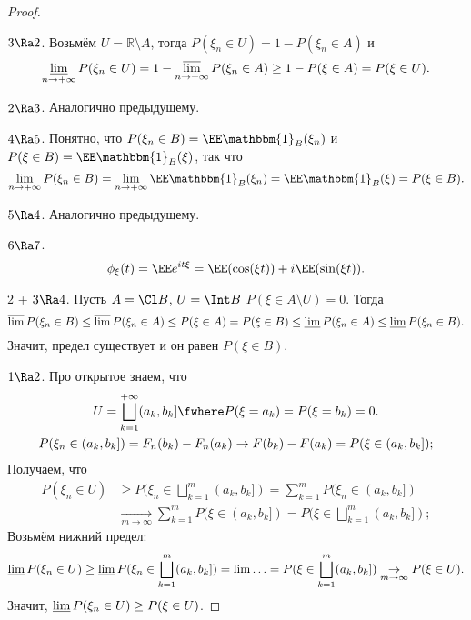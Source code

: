  \begin{proof}
    $ $\medskip
    
     $3 \Ra 2$. Возьмём $ U = \mathbb{R}\setminus A$, тогда
    $P(\xi_n\in U ) = 1 - P(\xi_n\in A)$ и
    $$\varliminf_{n\rightarrow+\infty} P(\xi_n\in U ) = 1 - \varlimsup_{n\rightarrow+\infty} P(\xi_n\in A) \ge 1-P(\xi\in A) = P(\xi\in U ).$$
    
    $2 \Ra 3$. Аналогично предыдущему.

     $4 \Ra 5$. Понятно, что $P(\xi_n\in B) = \EE \mathbbm{1}_B(\xi_n)$ и $P(\xi \in B) = \EE \mathbbm{1}_B(\xi)$, так что
     $$\lim_{n\rightarrow+\infty}P(\xi_n\in B)= \lim_{n\rightarrow+\infty} \EE \mathbbm{1}_B(\xi_n) = \EE \mathbbm{1}_B(\xi)  = P(\xi \in B).$$

    $5 \Ra 4$. Аналогично предыдущему.
    
     $6 \Ra 7$. 
     $$\phi_\xi(t) = \EE e^{it\xi} = \EE (\cos(\xi t)) + i\EE (\sin(\xi t)).$$

     $2$ + $3 \Ra 4$. Пусть $A=\Cl B$, $ U  = \Int B$ $P(\xi\in A\setminus  U ) = 0$. Тогда
     $$\varlimsup P(\xi_n\in B) \le \varlimsup P(\xi_n\in A) \le P(\xi \in A) = P(\xi\in B) \le \varliminf P(\xi_n \in A) \le \varliminf P(\xi_n \in B).$$
    Значит, предел существует и он равен $P(\xi\in B)$.

     $1 \Ra 2$. Про открытое знаем, что
     \begin{gather*}
          U  = \bigsqcup\limits_{k=1} ^ {+\infty} (a_k, b_k]\fwhere P(\xi = a_k) = P(\xi = b_k) = 0.\\
         P(\xi_n\in (a_k, b_k]) = F_n(b_k) - F_n(a_k)\rightarrow F(b_k) - F(a_k) = P(\xi \in (a_k, b_k]);
     \end{gather*}
     Получаем, что
     \begin{align*}
         P(\xi_n\in U )& \ge P(\xi_n\in \bigsqcup\limits_{k=1} ^ m (a_k, b_k]) = \sum\limits_{k=1} ^ m P(\xi_n\in (a_k, b_k]) \\& \underset{m\rightarrow \infty}{\rightarrow}\sum\limits_{k=1} ^ m P(\xi\in(a_k, b_k]) = P(\xi\in \bigsqcup\limits_{k=1} ^ m(a_k, b_k]);
     \end{align*}
    Возьмём нижний предел:
     $$ \varliminf  P(\xi_n\in U ) \ge \varliminf  P(\xi_n\in \bigsqcup\limits_{k=1} ^ m  (a_k, b_k]) = \lim \ldots =
         P(\xi\in \bigsqcup\limits_{k=1} ^ m (a_k, b_k])\underset{m\rightarrow \infty}{\rightarrow} P(\xi\in U ).$$
     Значит, $\varliminf  P(\xi_n\in U ) \ge P(\xi\in U )$.


\end{proof}
